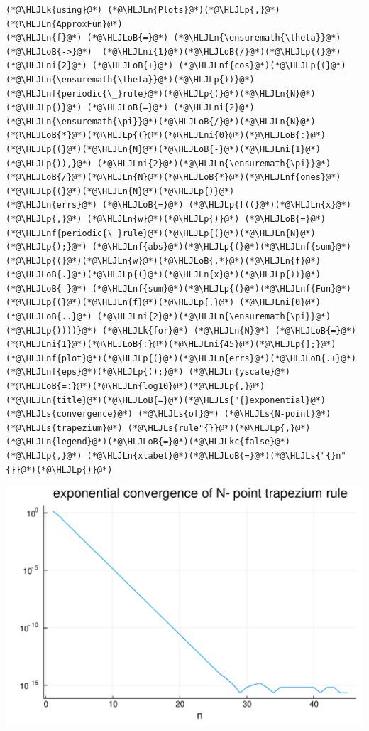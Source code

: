 \documentclass[12pt,a4paper]{article}
\newcommand{\HLJLk}[1]{\textcolor[RGB]{148,91,176}{\textbf{#1}}}
\newcommand{\HLJLkc}[1]{\textcolor[RGB]{59,151,46}{\textit{#1}}}
\newcommand{\HLJLn}[1]{#1}
\newcommand{\HLJLnf}[1]{\textcolor[RGB]{66,102,213}{#1}}
\newcommand{\HLJLs}[1]{\textcolor[RGB]{201,61,57}{#1}}
\newcommand{\HLJLni}[1]{\textcolor[RGB]{59,151,46}{#1}}
\newcommand{\HLJLoB}[1]{\textcolor[RGB]{102,102,102}{\textbf{#1}}}
\newcommand{\HLJLp}[1]{#1}
\begin{document}
\begin{lstlisting}
(*@\HLJLk{using}@*) (*@\HLJLn{Plots}@*)(*@\HLJLp{,}@*) (*@\HLJLn{ApproxFun}@*)
(*@\HLJLn{f}@*) (*@\HLJLoB{=}@*) (*@\HLJLn{\ensuremath{\theta}}@*) (*@\HLJLoB{->}@*)  (*@\HLJLni{1}@*)(*@\HLJLoB{/}@*)(*@\HLJLp{(}@*)(*@\HLJLni{2}@*) (*@\HLJLoB{+}@*) (*@\HLJLnf{cos}@*)(*@\HLJLp{(}@*)(*@\HLJLn{\ensuremath{\theta}}@*)(*@\HLJLp{))}@*)
(*@\HLJLnf{periodic{\_}rule}@*)(*@\HLJLp{(}@*)(*@\HLJLn{N}@*)(*@\HLJLp{)}@*) (*@\HLJLoB{=}@*) (*@\HLJLni{2}@*)(*@\HLJLn{\ensuremath{\pi}}@*)(*@\HLJLoB{/}@*)(*@\HLJLn{N}@*)(*@\HLJLoB{*}@*)(*@\HLJLp{(}@*)(*@\HLJLni{0}@*)(*@\HLJLoB{:}@*)(*@\HLJLp{(}@*)(*@\HLJLn{N}@*)(*@\HLJLoB{-}@*)(*@\HLJLni{1}@*)(*@\HLJLp{)),}@*) (*@\HLJLni{2}@*)(*@\HLJLn{\ensuremath{\pi}}@*)(*@\HLJLoB{/}@*)(*@\HLJLn{N}@*)(*@\HLJLoB{*}@*)(*@\HLJLnf{ones}@*)(*@\HLJLp{(}@*)(*@\HLJLn{N}@*)(*@\HLJLp{)}@*)
(*@\HLJLn{errs}@*) (*@\HLJLoB{=}@*) (*@\HLJLp{[((}@*)(*@\HLJLn{x}@*)(*@\HLJLp{,}@*) (*@\HLJLn{w}@*)(*@\HLJLp{)}@*) (*@\HLJLoB{=}@*) (*@\HLJLnf{periodic{\_}rule}@*)(*@\HLJLp{(}@*)(*@\HLJLn{N}@*)(*@\HLJLp{);}@*) (*@\HLJLnf{abs}@*)(*@\HLJLp{(}@*)(*@\HLJLnf{sum}@*)(*@\HLJLp{(}@*)(*@\HLJLn{w}@*)(*@\HLJLoB{.*}@*)(*@\HLJLn{f}@*)(*@\HLJLoB{.}@*)(*@\HLJLp{(}@*)(*@\HLJLn{x}@*)(*@\HLJLp{))}@*) (*@\HLJLoB{-}@*) (*@\HLJLnf{sum}@*)(*@\HLJLp{(}@*)(*@\HLJLnf{Fun}@*)(*@\HLJLp{(}@*)(*@\HLJLn{f}@*)(*@\HLJLp{,}@*) (*@\HLJLni{0}@*) (*@\HLJLoB{..}@*) (*@\HLJLni{2}@*)(*@\HLJLn{\ensuremath{\pi}}@*)(*@\HLJLp{))))}@*) (*@\HLJLk{for}@*) (*@\HLJLn{N}@*) (*@\HLJLoB{=}@*) (*@\HLJLni{1}@*)(*@\HLJLoB{:}@*)(*@\HLJLni{45}@*)(*@\HLJLp{];}@*)
(*@\HLJLnf{plot}@*)(*@\HLJLp{(}@*)(*@\HLJLn{errs}@*)(*@\HLJLoB{.+}@*)(*@\HLJLnf{eps}@*)(*@\HLJLp{();}@*) (*@\HLJLn{yscale}@*)(*@\HLJLoB{=:}@*)(*@\HLJLn{log10}@*)(*@\HLJLp{,}@*) (*@\HLJLn{title}@*)(*@\HLJLoB{=}@*)(*@\HLJLs{"{}exponential}@*) (*@\HLJLs{convergence}@*) (*@\HLJLs{of}@*) (*@\HLJLs{N-point}@*) (*@\HLJLs{trapezium}@*) (*@\HLJLs{rule"{}}@*)(*@\HLJLp{,}@*) (*@\HLJLn{legend}@*)(*@\HLJLoB{=}@*)(*@\HLJLkc{false}@*)(*@\HLJLp{,}@*) (*@\HLJLn{xlabel}@*)(*@\HLJLoB{=}@*)(*@\HLJLs{"{}n"{}}@*)(*@\HLJLp{)}@*)
\end{lstlisting}

\includegraphics[width=\linewidth]{figures/Lecture6_1_1.pdf}
\end{document}
